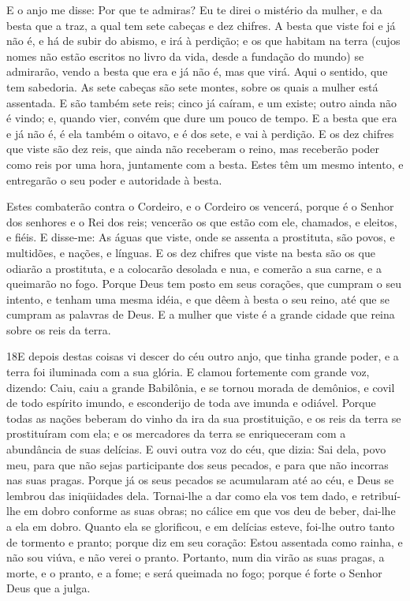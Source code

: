 E o anjo me disse: Por que te admiras? Eu te direi o mistério da
mulher, e da besta que a traz, a qual tem sete cabeças e dez
chifres. A besta que viste foi e já não é, e há de subir do
abismo, e irá à perdição; e os que habitam na terra (cujos nomes não
estão escritos no livro da vida, desde a fundação do mundo) se
admirarão, vendo a besta que era e já não é, mas que virá. Aqui
o sentido, que tem sabedoria. As sete cabeças são sete montes, sobre
os quais a mulher está assentada. E são também sete reis;
cinco já caíram, e um existe; outro ainda não é vindo; e, quando
vier, convém que dure um pouco de tempo. E a besta que era e
já não é, é ela também o oitavo, e é dos sete, e vai à perdição.
E os dez chifres que viste são dez reis, que ainda não
receberam o reino, mas receberão poder como reis por uma hora,
juntamente com a besta. Estes têm um mesmo intento, e
entregarão o seu poder e autoridade à besta.

Estes combaterão contra o Cordeiro, e o Cordeiro os vencerá,
porque é o Senhor dos senhores e o Rei dos reis; vencerão os que
estão com ele, chamados, e eleitos, e fiéis. E disse-me: As
águas que viste, onde se assenta a prostituta, são povos, e
multidões, e nações, e línguas. E os dez chifres que viste na
besta são os que odiarão a prostituta, e a colocarão desolada e nua,
e comerão a sua carne, e a queimarão no fogo. Porque Deus tem
posto em seus corações, que cumpram o seu intento, e tenham uma
mesma idéia, e que dêem à besta o seu reino, até que se cumpram as
palavras de Deus. E a mulher que viste é a grande cidade que
reina sobre os reis da terra.

\medskip

\lettrine{18} E depois destas coisas vi descer do céu outro
anjo, que tinha grande poder, e a terra foi iluminada com a sua
glória. E clamou fortemente com grande voz, dizendo: Caiu, caiu
a grande Babilônia, e se tornou morada de demônios, e covil de todo
espírito imundo, e esconderijo de toda ave imunda e odiável.
Porque todas as nações beberam do vinho da ira da sua
prostituição, e os reis da terra se prostituíram com ela; e os
mercadores da terra se enriqueceram com a abundância de suas
delícias. E ouvi outra voz do céu, que dizia: Sai dela, povo
meu, para que não sejas participante dos seus pecados, e para que
não incorras nas suas pragas. Porque já os seus pecados se
acumularam até ao céu, e Deus se lembrou das iniqüidades dela.
Tornai-lhe a dar como ela vos tem dado, e retribuí-lhe em dobro
conforme as suas obras; no cálice em que vos deu de beber, dai-lhe a
ela em dobro. Quanto ela se glorificou, e em delícias esteve,
foi-lhe outro tanto de tormento e pranto; porque diz em seu coração:
Estou assentada como rainha, e não sou viúva, e não verei o pranto.
Portanto, num dia virão as suas pragas, a morte, e o pranto, e a
fome; e será queimada no fogo; porque é forte o Senhor Deus que a
julga.


